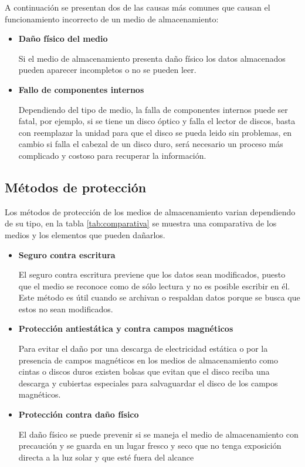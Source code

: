 A continuaci\'{o}n se presentan dos de las causas m\'{a}s comunes que causan el funcionamiento incorrecto de un medio de almacenamiento:

    \begin{itemize}

      \item \textbf{Da\~{n}o f\'{i}sico del medio}

Si el medio de almacenamiento presenta da\~{n}o f\'{i}sico los datos almacenados pueden aparecer incompletos o no se pueden leer.

      \item \textbf{Fallo de componentes internos}

Dependiendo del tipo de medio, la falla de componentes internos puede ser fatal, por ejemplo, si se tiene un disco \'{o}ptico y falla el lector de discos, basta con reemplazar la unidad para que el disco se pueda leido sin problemas, en cambio si falla el cabezal de un disco duro, ser\'{a} necesario un proceso m\'{a}s complicado y costoso para recuperar la informaci\'{o}n.

    \end{itemize}

  \subsection {M\'{e}todos de protecci\'{o}n}

Los m\'{e}todos de protecci\'{o}n de los medios de almacenamiento varian dependiendo de su tipo, en la tabla \ref{tab:comparativa} se muestra una comparativa de los medios y los elementos que pueden da\~{n}arlos.

    \begin{itemize}

      \item \textbf{Seguro contra escritura}

El seguro contra escritura previene que los datos sean modificados, puesto que el medio se reconoce como de s\'{o}lo lectura y no es posible escribir en \'{e}l. Este m\'{e}todo es \'{u}til cuando se archivan o respaldan datos porque se busca que estos no sean modificados.

      \item \textbf{Protecci\'{o}n antiest\'{a}tica y contra campos magn\'{e}ticos}

Para evitar el da\~{n}o por una descarga de electricidad est\'{a}tica o por la presencia de campos magn\'{e}ticos en los medios de almacenamiento como cintas o discos duros existen bolsas que evitan que el disco reciba una descarga y cubiertas especiales para salvaguardar el disco de los campos magn\'{e}ticos.

      \item \textbf{Protecci\'{o}n contra da\~{n}o f\'{i}sico}

El da\~{n}o f\'{i}sico se puede prevenir si se maneja el medio de almacenamiento con precauci\'{o}n y se guarda en un lugar fresco y seco que no tenga exposici\'{o}n directa a la luz solar y que est\'{e} fuera del alcance

    \end{itemize}

